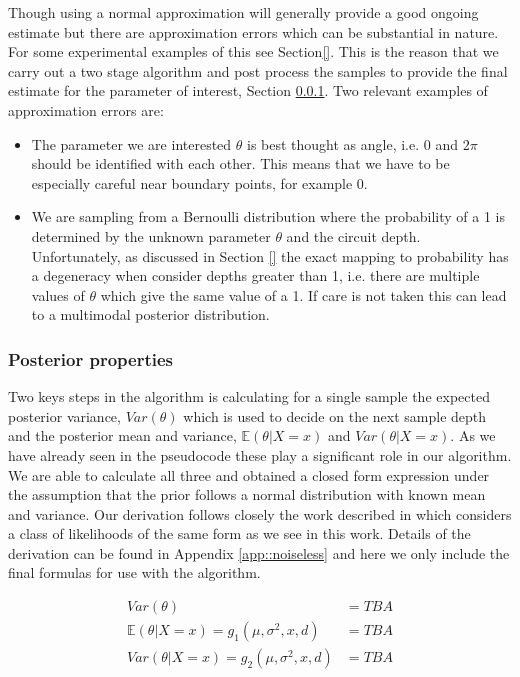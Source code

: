 Though using a normal approximation will generally provide a good ongoing estimate but there are approximation errors which can be substantial in nature. For some experimental examples of this see Section\ref{}. This is the reason that we carry out a two stage algorithm and post process the samples to provide the final estimate for the parameter of interest, Section \ref{sec::postprop}. Two relevant examples of approximation errors are:
\begin{itemize}
	\item The parameter we are interested $\theta$ is best thought as angle, i.e. $0$ and $2\pi$ should be identified with each other. This means that we have to be especially careful near boundary points, for example 0.
	\item We are sampling from a Bernoulli distribution where the probability of a 1 is determined by the unknown parameter $\theta$ and the circuit depth. Unfortunately, as discussed in Section \ref{} the exact mapping to probability has a degeneracy when consider depths greater than 1, i.e. there are multiple values of $\theta$ which give the same value of a 1. If care is not taken this can lead to a multimodal posterior distribution.
\end{itemize}

\subsubsection{Posterior properties}\label{sec::postprop}
Two keys steps in the algorithm is calculating for a single sample the expected posterior variance, $Var(\theta)$ which is used to decide on the next sample depth and the posterior mean and variance, $\mathbb{E}(\theta|X=x)$ and $Var(\theta|X=x)$. As we have already seen in the pseudocode these play a significant role in our algorithm. We are able to calculate all three and obtained a closed form expression under the assumption that the prior follows a normal distribution with known mean and variance. Our derivation follows closely the work described in \cite{} which considers a class of likelihoods of the same form as we see in this work. Details of the derivation can be found in Appendix \ref{app::noiseless} and here we only include the final formulas for use with the algorithm.

\begin{align}
Var(\theta) &= TBA \label{eqn::postvac}\\
 \mathbb{E}(\theta|X=x)= g_1(\mu,\sigma^2,x,d) &= TBA \label{eqn::mean}\\
 Var(\theta|X=x)=g_2(\mu,\sigma^2,x,d) &= TBA \label{eqn::var}
\end{align}



